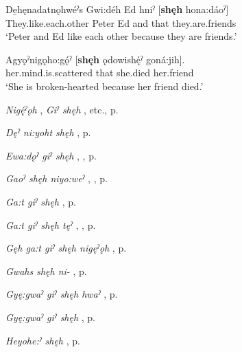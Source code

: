 \ea
\label{ex:spart26}
\gll De̱hęnadatnǫhwéˀs Gwi:déh Ed hniˀ [\textbf{shęh} hona:dáoˀ]\\
They.like.each.other Peter Ed and that they.are.friends\\
\glt ‘Peter and Ed like each other because they are friends.’
\z

\ea
\label{ex:spart27}
\gll Agyǫˀnigǫho:gǫ́ˀ [\textbf{shęh} ǫdowishę́ˀ goná:jih].\\
her.mind.is.scattered that she.died her.friend\\
\glt ‘She is broken-hearted because her friend died.’
\z

\begin{CayugaRelated}
\item \textit{Nigę́ˀǫh} , \textit{Giˀ shęh} , etc., p. \pageref{ch:[nigę́ˀǫh] ‘or?’, [giˀ shęh] ‘or’, etc}\\
\item \textit{Dęˀ ni:yoht shęh} , p. \pageref{p:[dęˀ ni:yoht shęh]}\\
\item \textit{Ewa:dǫˀ giˀ shęh} , , p. \pageref{p:[ęwa:dǫˀ giˀ shęh]}\\
\item \textit{Gaoˀ shęh niyo:weˀ} , , p. \pageref{p:[gaoˀ shęh niyo:weˀ]}\\
\item \textit{Ga:t giˀ shęh} , p. \pageref{p:[ga:t giˀ shęh]}\\
\item \textit{Ga:t giˀ shęh tęˀ} , , p. \pageref{p:[ga:t giˀ shęh tęˀ]}\\
\item \textit{Gęh ga:t giˀ shęh nigęˀǫh} , p. \pageref{p:[gęh ga:t giˀ shęh nigęˀǫh]}\\
\item \textit{Gwahs shęh ni-} , p. \pageref{p:[gwahs shęh ni-]}\\
\item \textit{Gyę:gwaˀ giˀ shęh hwaˀ} , p. \pageref{p:[gyę:gwaˀ giˀ shęh hwaˀ]}\\
\item \textit{Gyę:gwaˀ giˀ shęh} , p. \pageref{p:[gyę:gwaˀ giˀ shęh]}\\
\item \textit{Heyohe:ˀ shęh} , p. \pageref{p:[heyohe:ˀ shęh]}\\

\end{CayugaRelated}
